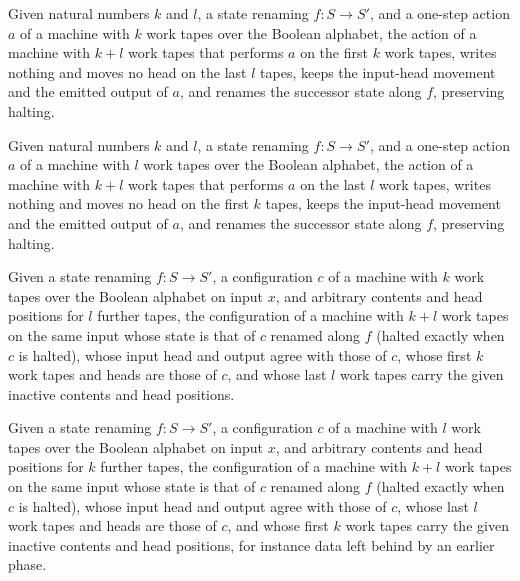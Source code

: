 \begin{definition}
\label{Turing.FinTM.leftAction}
\leanok
{}
Given natural numbers $k$ and $l$, a state renaming $f : S \to S'$, and a
one-step action $a$ of a machine with $k$ work tapes over the Boolean
alphabet, the action of a machine with $k + l$ work tapes that performs $a$
on the first $k$ work tapes, writes nothing and moves no head on the last $l$
tapes, keeps the input-head movement and the emitted output of $a$, and
renames the successor state along $f$, preserving halting.
\end{definition}

\begin{definition}
\label{Turing.FinTM.rightAction}
\leanok
{}
Given natural numbers $k$ and $l$, a state renaming $f : S \to S'$, and a
one-step action $a$ of a machine with $l$ work tapes over the Boolean
alphabet, the action of a machine with $k + l$ work tapes that performs $a$
on the last $l$ work tapes, writes nothing and moves no head on the first $k$
tapes, keeps the input-head movement and the emitted output of $a$, and
renames the successor state along $f$, preserving halting.
\end{definition}

\begin{definition}
\label{Turing.FinTM.leftCfg}
\leanok
{}
Given a state renaming $f : S \to S'$, a configuration $c$ of a machine with
$k$ work tapes over the Boolean alphabet on input $x$, and arbitrary contents
and head positions for $l$ further tapes, the configuration of a machine with
$k + l$ work tapes on the same input whose state is that of $c$ renamed along
$f$ (halted exactly when $c$ is halted), whose input head and output agree
with those of $c$, whose first $k$ work tapes and heads are those of $c$, and
whose last $l$ work tapes carry the given inactive contents and head
positions.
\end{definition}

\begin{definition}
\label{Turing.FinTM.rightCfg}
\leanok
{}
Given a state renaming $f : S \to S'$, a configuration $c$ of a machine with
$l$ work tapes over the Boolean alphabet on input $x$, and arbitrary contents
and head positions for $k$ further tapes, the configuration of a machine with
$k + l$ work tapes on the same input whose state is that of $c$ renamed along
$f$ (halted exactly when $c$ is halted), whose input head and output agree
with those of $c$, whose last $l$ work tapes and heads are those of $c$, and
whose first $k$ work tapes carry the given inactive contents and head
positions, for instance data left behind by an earlier phase.
\end{definition}

